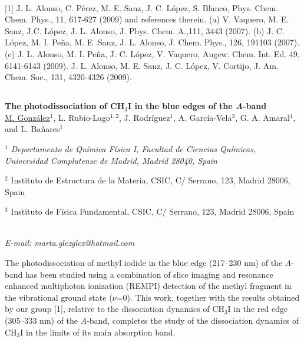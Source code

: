 \\
{\footnotesize
[1] J. L. Alonso, C. Pérez, M. E. Sanz, J. C. López, S. Blanco, Phys. Chem. Chem. Phys., 11, 617-627 (2009) and references therein.
\newline
[2] (a) V. Vaquero, M. E. Sanz, J.C. López, J. L. Alonso, J. Phys. Chem. A.,111, 3443 (2007). (b) J. C.  López, M. I. Peña, M. E .Sanz, J. L. Alonso, J. Chem. Phys., 126, 191103 (2007). (c) J. L. Alonso, M. I. Peña, J. C. López, V. Vaquero, Angew. Chem. Int. Ed. 49, 6141-6143 (2009).
\newline
[3] J. L. Alonso, M. E. Sanz, J. C. López, V. Cortijo, J. Am. Chem. Soc., 131, 4320-4326 (2009).
}

\newpage
\setcounter{figure}{0}
\begin{center}
\section*{}
{\bf \Large
The photodissociation of CH$_3$I in the blue edges of the \textit{A}-band
}
\\
\vspace{0.5cm}
\underline{M. González}$^{1}$, L. Rubio-Lago$^{1,2}$, J. Rodríguez$^{1}$, A. García-Vela$^{3}$, G. A. Amaral$^{1}$, and
L. Bañares$^{1}$
\\
\vspace{0.5cm}
{\it 
$^{1}$ Departamento de Química Física I, Facultad de Ciencias Químicas, Universidad Complutense de
Madrid, Madrid 28040, Spain

$^{2}$ Instituto de Estructura de la Materia, CSIC, C/ Serrano, 123, Madrid 28006, Spain

$^{3}$ Instituto de Física Fundamental, CSIC, C/ Serrano, 123, Madrid 28006, Spain
}
\\
\vspace{0.5cm}
{\it E-mail: marta.glezglez@hotmail.com}
\\
\vspace{0.5cm}
\end{center}
The photodissociation of methyl iodide in the blue edge (217–230 nm) of the \textit{A}-band has been studied
using a combination of slice imaging and resonance enhanced
multiphoton ionization (REMPI) detection of the methyl fragment in the vibrational
ground state ($\nu$=0). This work, together with the results obtained by our group [1],
relative to the dissociation dynamics of CH$_3$I in the red edge (305–333 nm) of the \textit{A}-band,
completes the study of the dissociation dynamics of CH$_3$I in the limits of its
main absorption band.

